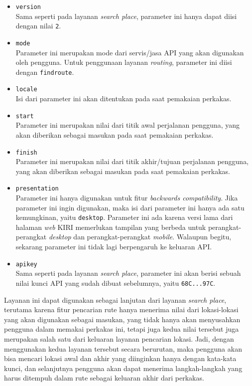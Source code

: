 \begin{itemize}
	\item \verb|version|\\
	Sama seperti pada layanan \textit{search place}, parameter ini hanya dapat diisi dengan nilai \verb|2|.
	\item \verb|mode|\\
	Parameter ini merupakan mode dari servis/jasa API yang akan digunakan oleh pengguna. Untuk penggunaan layanan \textit{routing}, parameter ini diisi dengan \verb|findroute|.
	\item \verb|locale|\\
	Isi dari parameter ini akan ditentukan pada saat pemakaian perkakas.
	\item \verb|start|\\
	Parameter ini merupakan nilai \latlon dari titik awal perjalanan pengguna, yang akan diberikan sebagai masukan pada saat pemakaian perkakas.
	\item \verb|finish|\\
	Parameter ini merupakan nilai \latlon dari titik akhir/tujuan perjalanan pengguna, yang akan diberikan sebagai masukan pada saat pemakaian perkakas.
	\item \verb|presentation|\\
	Parameter ini hanya digunakan untuk fitur \textit{backwards compatibility}. Jika parameter ini ingin digunakan, maka isi dari parameter ini hanya ada satu kemungkinan, yaitu \verb|desktop|. Parameter ini ada karena versi lama dari halaman \textit{web} KIRI memerlukan tampilan yang berbeda untuk perangkat-perangkat \textit{desktop} dan perangkat-perangkat \textit{mobile}. Walaupun begitu, sekarang parameter ini tidak lagi berpengaruh ke keluaran API.
	\item \verb|apikey|\\
	Sama seperti pada layanan \textit{search place}, parameter ini akan berisi sebuah nilai kunci API yang sudah dibuat sebelumnya, yaitu \verb|68C...97C|.
\end{itemize}
\vspace{\baselineskip}\noindent
Layanan ini dapat digunakan sebagai lanjutan dari layanan \textit{search place}, terutama karena fitur pencarian rute hanya menerima nilai \latlon dari lokasi-lokasi yang akan digunakan sebagai masukan, yang tidak hanya akan menyusahkan pengguna dalam memakai perkakas \cl ini, tetapi juga kedua nilai tersebut juga merupakan salah satu dari keluaran layanan pencarian lokasi. Jadi, dengan menggunakan kedua layanan tersebut secara berurutan, maka pengguna akan bisa mencari lokasi awal dan akhir yang diinginkan hanya dengan kata-kata kunci, dan selanjutnya pengguna akan dapat menerima langkah-langkah yang harus ditempuh dalam rute sebagai keluaran akhir dari perkakas.

